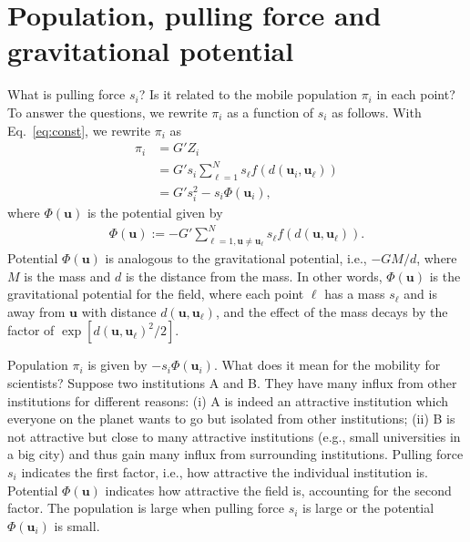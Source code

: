 \documentclass[12pt]{article} %
\def\vec#1{{\bm #1}}
\begin{document}
\section{Population, pulling force and gravitational potential}

What is pulling force $s_i$? Is it related to the mobile population $\pi_i$ in each point?
To answer the questions, we rewrite $\pi_i$ as a function of $s_i$ as follows. 
With Eq.~\eqref{eq:const}, we rewrite $\pi_i$ as 
\begin{align}
    \pi_i &= G' Z_i \nonumber \\
        &= G' s_i \sum_{\ell=1}^N s_\ell f\left(d\left(\vec{u}_i,\vec{u}_\ell\right)\right) \nonumber \\ 
        &= G' s_i ^2 - s_i \Phi(\vec{u}_i), \label{eq:flow_gravity_model_2} %
\end{align}
where $\Phi(\vec{u})$ is the potential given by 
\begin{align}
    \Phi(\vec{u}):=-G' \sum_{\ell=1, \vec{u}\neq \vec{u}_\ell}^N s_\ell f\left(d\left(\vec{u},\vec{u}_\ell\right)\right).
\end{align}
Potential $\Phi(\vec{u})$ is analogous to the gravitational potential, i.e., $-GM/d$, where $M$ is the mass and $d$ is the distance from the mass.
In other words,  $\Phi(\vec{u})$ is the gravitational potential for the field, where 
each point $\ell$ has a mass $s_{\ell}$ and is away from $\vec{u}$ with distance $d(\vec{u},\vec{u}_\ell)$, and the effect of the mass decays by the factor of $\exp\left[d(\vec{u},\vec{u}_\ell) ^2 /2\right]$.

Population $\pi_i$ is given by $-s_i\Phi(\vec{u}_i)$. What does it mean for the mobility for scientists?
Suppose two institutions A and B. They have many influx from other institutions for different reasons:
(i) A is indeed an attractive institution which everyone on the planet wants to go but isolated from other institutions;
(ii) B is not attractive but close to many attractive institutions (e.g., small universities in a big city) and thus gain many influx from surrounding institutions.
Pulling force $s_i$ indicates the first factor, i.e., how attractive the individual institution is. 
Potential $\Phi(\vec{u})$ indicates how attractive the field is, accounting for the second factor.
The population is large when pulling force $s_i$ is large or the potential $\Phi(\vec{u}_i)$ is small. 
\end{document}
